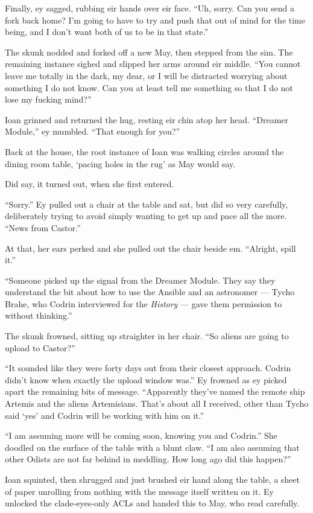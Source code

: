Finally, ey sagged, rubbing eir hands over eir face. ``Uh, sorry. Can you send a fork back home? I'm going to have to try and push that out of mind for the time being, and I don't want both of us to be in that state.''

The skunk nodded and forked off a new May, then stepped from the sim. The remaining instance sighed and slipped her arms around eir middle. ``You cannot leave me totally in the dark, my dear, or I will be distracted worrying about something I do not know. Can you at least tell me something so that I do not lose my fucking mind?''

Ioan grinned and returned the hug, resting eir chin atop her head. ``Dreamer Module,'' ey mumbled. ``That enough for you?''

Back at the house, the root instance of Ioan was walking circles around the dining room table, `pacing holes in the rug' as May would say.

Did say, it turned out, when she first entered.

``Sorry.'' Ey pulled out a chair at the table and sat, but did so very carefully, deliberately trying to avoid simply wanting to get up and pace all the more. ``News from Castor.''

At that, her ears perked and she pulled out the chair beside em. ``Alright, spill it.''

``Someone picked up the signal from the Dreamer Module. They say they understand the bit about how to use the Ansible and an astronomer — Tycho Brahe, who Codrin interviewed for the \emph{History} — gave them permission to without thinking.''

The skunk frowned, sitting up straighter in her chair. ``So aliens are going to upload to Castor?''

``It sounded like they were forty days out from their closest approach. Codrin didn't know when exactly the upload window was.'' Ey frowned as ey picked apart the remaining bits of message. ``Apparently they've named the remote ship Artemis and the aliens Artemisians. That's about all I received, other than Tycho said `yes' and Codrin will be working with him on it.''

``I am assuming more will be coming soon, knowing you and Codrin.'' She doodled on the surface of the table with a blunt claw. ``I am also assuming that other Odists are not far behind in meddling. How long ago did this happen?''

Ioan squinted, then shrugged and just brushed eir hand along the table, a sheet of paper unrolling from nothing with the message itself written on it. Ey unlocked the clade-eyes-only ACLs and handed this to May, who read carefully.

